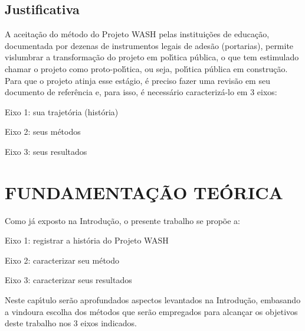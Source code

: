 \documentclass[
12pt,		%
openright,	%
twoside,  %
a4paper,			%
chapter=TITLE,		%
english,			%
french,				%
spanish,			%
brazil				%
]{USPSC-classe/USPSC}
\begin{document}
\section[Justificativa]{Justificativa}\label{Justificativa}
A aceita\c{c}\~ao do m\'etodo do Projeto WASH pelas institui\c{c}\~oes de educa\c{c}\~ao, documentada por dezenas de instrumentos legais de ades\~ao (portarias), permite vislumbrar a transforma\c{c}\~ao do projeto em pol\'{\i}tica p\'ublica, o que tem estimulado chamar o projeto como \textquotedbl proto-pol\'{\i}tica\textquotedbl , ou seja, pol\'{\i}tica p\'ublica em constru\c{c}\~ao. Para que o projeto atinja esse est\'agio, \'e preciso fazer uma revis\~ao em seu documento de refer\^encia e, para isso, \'e necess\'ario caracteriz\'a-lo em 3 eixos:















\begin{alineas}
\item Eixo 1: sua trajet\'oria (hist\'oria)
\item Eixo 2: seus m\'etodos
\item Eixo 3: seus resultados
\end{alineas}

\chapter[FUNDAMENTA\c{C}\~AO TE\'ORICA ]{FUNDAMENTA\c{C}\~AO TE\'ORICA }\label{FUNDAMENTA\c{C}\~AO TE\'ORICA }
Como j\'a exposto na \textquotedbl Introdu\c{c}\~ao\textquotedbl , o presente trabalho se prop\~oe a:















\begin{alineas}
\item Eixo 1: registrar a hist\'oria do Projeto WASH
\item Eixo 2: caracterizar seu m\'etodo
\item Eixo 3: caracterizar seus resultados
\end{alineas}

Neste cap\'{\i}tulo ser\~ao aprofundados aspectos levantados na Introdu\c{c}\~ao, embasando a vindoura escolha dos m\'etodos que ser\~ao empregados para alcan\c{c}ar os objetivos deste trabalho nos 3 eixos indicados.
\end{document}
